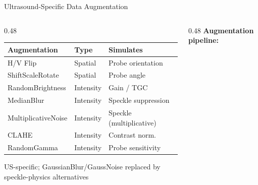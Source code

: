 \documentclass[aspectratio=169, 10pt]{beamer}
\begin{document}
\begin{frame}{Ultrasound-Specific Data Augmentation}
  \begin{columns}[T]
    \begin{column}{0.48\textwidth}
      \begin{center}
      {\small
      \begin{tabular}{lll}
        \toprule
        Augmentation & Type & Simulates \\
        \midrule
        H/V Flip              & Spatial   & Probe orientation \\
        ShiftScaleRotate      & Spatial   & Probe angle \\
        \rowcolor{rowhl}
        RandomBrightness      & Intensity & Gain / TGC \\
        \rowcolor{rowhl}
        MedianBlur            & Intensity & Speckle suppression \\
        \rowcolor{rowhl}
        MultiplicativeNoise   & Intensity & Speckle (multiplicative) \\
        \rowcolor{rowhl}
        CLAHE                 & Intensity & Contrast norm. \\
        \rowcolor{rowhl}
        RandomGamma           & Intensity & Probe sensitivity \\
        \bottomrule
      \end{tabular}
      }
      \end{center}
      \vspace{4pt}
      {\footnotesize \colorbox{rowhl}{\phantom{x}} US-specific; GaussianBlur/GaussNoise replaced by speckle-physics alternatives}
    \end{column}
    \begin{column}{0.48\textwidth}
      {\small\textbf{Augmentation pipeline:}}
      \vspace{4pt}

\end{column}
\end{columns}
\end{frame}
\end{document}
